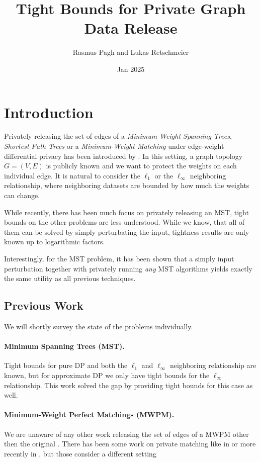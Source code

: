 \documentclass{article}
\title{Tight Bounds for Private Graph Data Release}
\author{Rasmus Pagh and Lukas Retschmeier}
\date{Jan 2025}
\begin{document}
\maketitle


\section{Introduction}

Privately releasing the set of edges of a \emph{Minimum-Weight Spanning Trees}, \emph{Shortest Path Trees} or a  \emph{Minimum-Weight Matching} under edge-weight differential privacy has been introduced by \cite*{sealfon_shortest_2016}. 
In this setting, a graph topology $G = (V, E)$ is publicly known and we want to protect the weights on each individual edge.
It is natural to consider the $\ell_1$ or the $\ell_\infty$ neighboring relationship, where neighboring datasets are bounded by how much the weights can change.

While recently, there has been much focus on privately releasing an MST, tight bounds on the other problems are less understood.
While we know, that all of them can be solved by simply perturbating the input, tightness results are only known up to logarithmic factors.


Interestingly, for the MST problem, it has been shown that a simply input perturbation together with privately running \emph{any} MST algorithms yields exactly the same utility as all previous techniques. 
\subsection{Previous Work}
We will shortly survey the state of the problems individually.

\paragraph{Minimum Spanning Trees (MST).}
Tight bounds for pure DP and both the $\ell_1$ and $\ell_\infty$ neighboring relationship are known, but for approximate DP we only have tight bounds for the $\ell_\infty$ relationship.
This work solved the gap by providing tight bounds for this case as well.

\paragraph{Minimum-Weight Perfect Matchings (MWPM).}
We are unaware of any other work releasing the set of edges of a MWPM other then the original \cite{sealfon_shortest_2016}.
There has been some work on private matching like in \cite{hsu2014} or more recently in \cite{}, but those consider a different setting 
\end{document}
